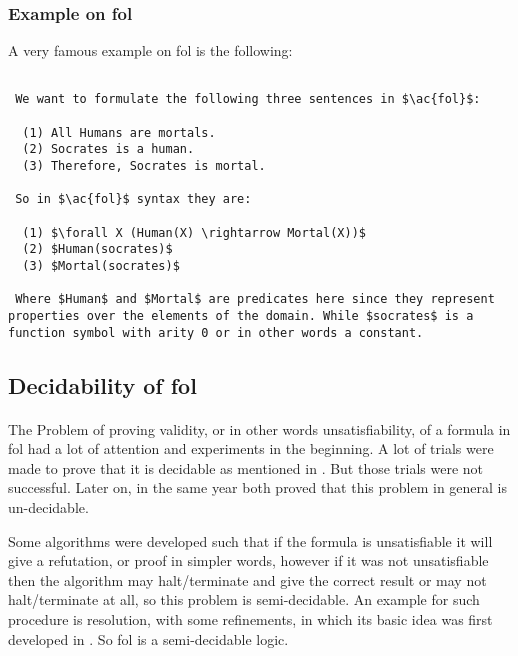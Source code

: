 \subsubsection{Example on \ac{fol}}
A very famous example on \ac{fol} is the following:
\begin{lstlisting}[caption=Example on \ac{fol},mathescape,breaklines=true,frame=single]

 We want to formulate the following three sentences in $\ac{fol}$:

  (1) All Humans are mortals.
  (2) Socrates is a human.
  (3) Therefore, Socrates is mortal.
  
 So in $\ac{fol}$ syntax they are:

  (1) $\forall X (Human(X) \rightarrow Mortal(X))$
  (2) $Human(socrates)$
  (3) $Mortal(socrates)$
  
 Where $Human$ and $Mortal$ are predicates here since they represent properties over the elements of the domain. While $socrates$ is a function symbol with arity 0 or in other words a constant. 

\end{lstlisting}



\subsection{Decidability of \ac{fol}}
\paragraph{}
The Problem of proving validity, or in other words unsatisfiability, of a formula in \acf{fol} had a lot of attention and experiments in the beginning. A lot of trials were made to prove that it is decidable as mentioned in \cite{SL_14}. But those trials were not successful. Later on, in the same year both \cite{DEC_TUR, DEC_CHURCH} proved that this problem in general is un-decidable.


Some algorithms were developed such that if the formula is unsatisfiable it will give a refutation, or proof in simpler words, however if it was not unsatisfiable then the algorithm may halt/terminate and give the correct result or may not halt/terminate at all, so this problem is semi-decidable. An example for such procedure is resolution, with some refinements, in which its basic idea was first developed in \cite{RES_65}. So \acf{fol} is a semi-decidable logic.



